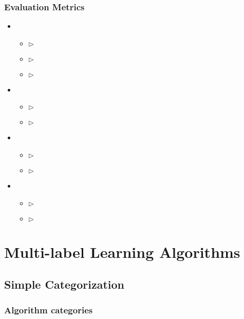 \documentclass{beamer}
\begin{document}
\begin{frame}
\frametitle{Evaluation Metrics}
\begin{itemize}
\item 

	\begin{itemize}
	\item [] $\rhd$ 
	\item [] $\rhd$ 
	\item [] $\rhd$ 
	\end{itemize}

\item 

	\begin{itemize}
	\item [] $\rhd$ 
	\item [] $\rhd$ 
	\end{itemize}

\item 
	\begin{itemize}
	\item [] $\rhd$ 
	\item [] $\rhd$
	\end{itemize}

\item 
	\begin{itemize}
	\item [] $\rhd$ 
	\item [] $\rhd$
	\end{itemize}
\end{itemize}

\end{frame}



\section{Multi-label Learning Algorithms}


\subsection{Simple Categorization}

\begin{frame}
	\frametitle{Algorithm categories}
	
\end{frame}
\end{document}
